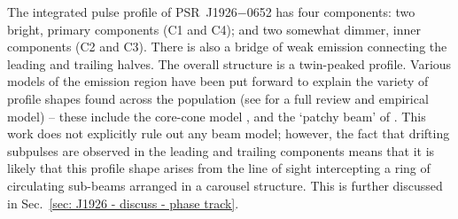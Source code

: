 The integrated pulse profile of PSR~J1926$-$0652 has four components: two bright, primary components (C1 and C4); and two somewhat dimmer, inner components (C2 and C3). There is also a bridge of weak emission connecting the leading and trailing halves. The overall structure is a twin-peaked profile. Various models of the emission region have been put forward to explain the variety of profile shapes found across the population (see \citealt{KJxx2007} for a full review and empirical model) -- these include the core-cone model \citep[e.g.][]{Rxxx1983a, Rxxx1986}, and the `patchy beam' of \citet{LMxx1988}. This work does not explicitly rule out any beam model; however, the fact that drifting subpulses are observed in the leading and trailing components means that it is likely that this profile shape arises from the line of sight intercepting a ring of circulating sub-beams arranged in a carousel structure. This is further discussed in Sec.~\ref{sec: J1926 - discuss - phase track}.

